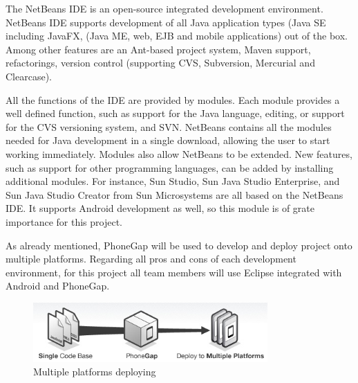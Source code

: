 The NetBeans IDE is an open-source integrated development environment. NetBeans IDE supports development of all Java application types (Java SE including JavaFX, (Java ME, web, EJB and mobile applications) out of the box. Among other features are an Ant-based project system, Maven support, refactorings, version control (supporting CVS, Subversion, Mercurial and Clearcase).

All the functions of the IDE are provided by modules. Each module provides a well defined function, such as support for the Java language, editing, or support for the CVS versioning system, and SVN. NetBeans contains all the modules needed for Java development in a single download, allowing the user to start working immediately. Modules also allow NetBeans to be extended. New features, such as support for other programming languages, can be added by installing additional modules. For instance, Sun Studio, Sun Java Studio Enterprise, and Sun Java Studio Creator from Sun Microsystems are all based on the NetBeans IDE. It supports Android development as well, so this module is of grate importance for this project.

As already mentioned, PhoneGap will be used to develop and deploy project onto multiple platforms. Regarding all pros and cons of each development environment, for this project all team members will use Eclipse integrated with Android and PhoneGap.\newline

\begin{figure}[phonegap]
	\centering
	\includegraphics[width=0.8\textwidth]{organizational/development_environment/PhoneGap.jpg}
	\caption{Multiple platforms deploying}
	\label{fig:phonegap}
\end{figure}
